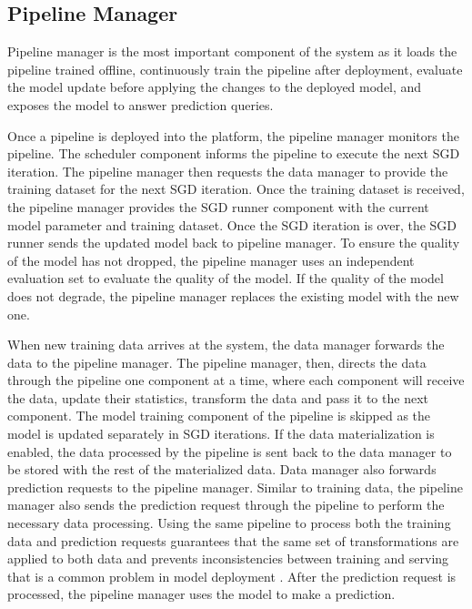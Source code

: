 \subsection{Pipeline Manager} \label{pipeline-manager} 
Pipeline manager is the most important component of the system as it loads the pipeline trained offline, continuously train the pipeline after deployment, evaluate the model update before applying the changes to the deployed model, and exposes the model to answer prediction queries.

Once a pipeline is deployed into the platform, the pipeline manager monitors the pipeline.
The scheduler component informs the pipeline to execute the next SGD iteration.
The pipeline manager then requests the data manager to provide the training dataset for the next SGD iteration.
Once the training dataset is received, the pipeline manager provides the SGD runner component with the current model parameter and training dataset.
Once the SGD iteration is over, the SGD runner sends the updated model back to pipeline manager.
To ensure the quality of the model has not dropped, the pipeline manager uses an independent evaluation set to evaluate the quality of the model.
If the quality of the model does not degrade, the pipeline manager replaces the existing model with the new one.

When new training data arrives at the system, the data manager forwards the data to the pipeline manager. 
The pipeline manager, then, directs the data through the pipeline one component at a time, where each component will receive the data, update their statistics, transform the data and pass it to the next component.
The model training component of the pipeline is skipped as the model is updated separately in SGD iterations.
If the data materialization is enabled, the data processed by the pipeline is sent back to the data manager to be stored with the rest of the materialized data.
Data manager also forwards prediction requests to the pipeline manager.
Similar to training data, the pipeline manager also sends the prediction request through the pipeline to perform the necessary data processing.
Using the same pipeline to process both the training data and prediction requests guarantees that the same set of transformations are applied to both data and prevents inconsistencies between training and serving that is a common problem in model deployment \cite{baylor2017tfx}.
After the prediction request is processed, the pipeline manager uses the model to make a prediction.

